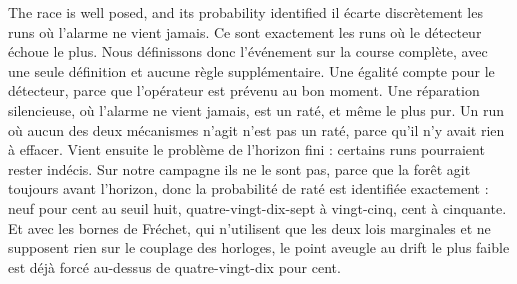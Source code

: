\documentclass[aspectratio=169,11pt]{beamer}
\begin{document}
\begin{frame}{The race is well posed, and its probability identified}
{    il écarte discrètement les runs où l'alarme ne vient jamais. Ce sont exactement les runs
    où le détecteur échoue le plus. Nous définissons donc l'événement sur la course
    complète, avec une seule définition et aucune règle supplémentaire. Une égalité compte
    pour le détecteur, parce que l'opérateur est prévenu au bon moment. Une réparation
    silencieuse, où l'alarme ne vient jamais, est un raté, et même le plus pur. Un run où
    aucun des deux mécanismes n'agit n'est pas un raté, parce qu'il n'y avait rien à
    effacer. Vient ensuite le problème de l'horizon fini : certains runs pourraient rester
    indécis. Sur notre campagne ils ne le sont pas, parce que la forêt agit toujours avant
    l'horizon, donc la probabilité de raté est identifiée exactement : neuf pour cent au
    seuil huit, quatre-vingt-dix-sept à vingt-cinq, cent à cinquante. Et avec les bornes de
    Fréchet, qui n'utilisent que les deux lois marginales et ne supposent rien sur le
    couplage des horloges, le point aveugle au drift le plus faible est déjà forcé au-dessus
    de quatre-vingt-dix pour cent.}
\end{frame}
\end{document}
